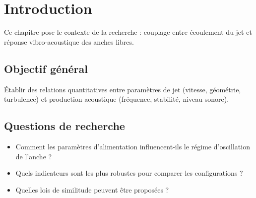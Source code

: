 \chapter{Introduction}

Ce chapitre pose le contexte de la recherche : couplage entre écoulement du jet et réponse vibro-acoustique des anches libres.

\section{Objectif général}
Établir des relations quantitatives entre paramètres de jet (vitesse, géométrie, turbulence) et production acoustique (fréquence, stabilité, niveau sonore).

\section{Questions de recherche}
\begin{itemize}
  \item Comment les paramètres d’alimentation influencent-ils le régime d’oscillation de l’anche ?
  \item Quels indicateurs sont les plus robustes pour comparer les configurations ?
  \item Quelles lois de similitude peuvent être proposées ?
\end{itemize}
